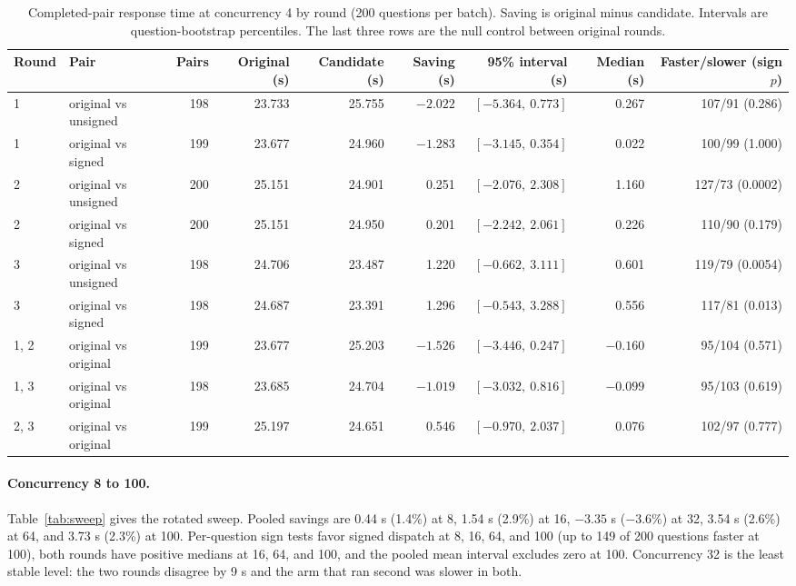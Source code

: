 \documentclass[paper]{ieice}
\begin{document}
\begin{table}[!t]
\caption{Completed-pair response time at concurrency 4 by round (200 questions per batch). Saving is original minus candidate. Intervals are question-bootstrap percentiles. The last three rows are the null control between original rounds.}
\label{tab:latency4}
\centering\footnotesize
\setlength{\tabcolsep}{3pt}
\begin{tabular}{llrrrrrrr}
\toprule
Round & Pair & Pairs & Original (s) & Candidate (s) & Saving (s) & 95\% interval (s) & Median (s) & Faster/slower (sign $p$)\\
\midrule
1 & original vs unsigned & 198 & 23.733 & 25.755 & $-2.022$ & $[-5.364,\ 0.773]$ & 0.267 & 107/91 (0.286)\\
1 & original vs signed & 199 & 23.677 & 24.960 & $-1.283$ & $[-3.145,\ 0.354]$ & 0.022 & 100/99 (1.000)\\
2 & original vs unsigned & 200 & 25.151 & 24.901 & 0.251 & $[-2.076,\ 2.308]$ & 1.160 & 127/73 (0.0002)\\
2 & original vs signed & 200 & 25.151 & 24.950 & 0.201 & $[-2.242,\ 2.061]$ & 0.226 & 110/90 (0.179)\\
3 & original vs unsigned & 198 & 24.706 & 23.487 & 1.220 & $[-0.662,\ 3.111]$ & 0.601 & 119/79 (0.0054)\\
3 & original vs signed & 198 & 24.687 & 23.391 & 1.296 & $[-0.543,\ 3.288]$ & 0.556 & 117/81 (0.013)\\
\midrule
1, 2 & original vs original & 199 & 23.677 & 25.203 & $-1.526$ & $[-3.446,\ 0.247]$ & $-0.160$ & 95/104 (0.571)\\
1, 3 & original vs original & 198 & 23.685 & 24.704 & $-1.019$ & $[-3.032,\ 0.816]$ & $-0.099$ & 95/103 (0.619)\\
2, 3 & original vs original & 199 & 25.197 & 24.651 & 0.546 & $[-0.970,\ 2.037]$ & 0.076 & 102/97 (0.777)\\
\bottomrule
\end{tabular}
\end{table}

\paragraph{Concurrency 8 to 100.}
Table~\ref{tab:sweep} gives the rotated sweep. Pooled savings are 0.44 s (1.4\%) at 8, 1.54 s (2.9\%) at 16, $-3.35$ s ($-3.6\%$) at 32, 3.54 s (2.6\%) at 64, and 3.73 s (2.3\%) at 100. Per-question sign tests favor signed dispatch at 8, 16, 64, and 100 (up to 149 of 200 questions faster at 100), both rounds have positive medians at 16, 64, and 100, and the pooled mean interval excludes zero at 100. Concurrency 32 is the least stable level: the two rounds disagree by 9 s and the arm that ran second was slower in both.
\end{document}
